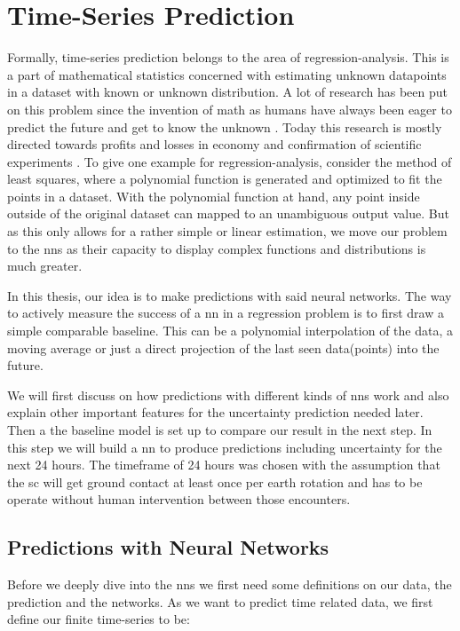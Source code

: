 \chapter{Time-Series Prediction}
\label{c:prediction}
Formally, time-series prediction belongs to the area of regression-analysis. This is a part of mathematical statistics concerned with estimating unknown datapoints in a dataset with known or unknown distribution. A lot of research has been put on this problem since the invention of math as humans have always been eager to predict the future and get to know the unknown \cite{prediction-history}. Today this research is mostly directed towards profits and losses in economy and confirmation of scientific experiments \cite{regression-book}. \newline
To give one example for regression-analysis, consider the method of least squares, where a polynomial function is generated and optimized to fit the points in a dataset. With the polynomial function at hand, any point inside outside of the original dataset can mapped to an unambiguous output value. But as this only allows for a rather simple or linear estimation, we move our problem to the \acp{nn} as their capacity to display complex functions and distributions is much greater.

In this thesis, our idea is to make predictions with said neural networks. The way to actively measure the success of a \ac{nn} in a regression problem is to first draw a simple comparable baseline. This can be a polynomial interpolation of the data, a moving average or just a direct projection of the last seen data(points) into the future. %

We will first discuss on how predictions with different kinds of \acp{nn} work and also explain other important features for the uncertainty prediction needed later. Then a the baseline model is set up to compare our result in the next step. In this step we will build a \ac{nn} to produce predictions including uncertainty for the next 24 hours. The timeframe of 24 hours was chosen with the assumption that the \ac{sc} will get ground contact at least once per earth rotation and has to be operate without human intervention between those encounters.

\section{Predictions with Neural Networks}
\label{c:nn-blocks}
Before we deeply dive into the \acp{nn} we first need some definitions on our data, the prediction and the networks. As we want to predict time related data, we first define our finite time-series to be:

